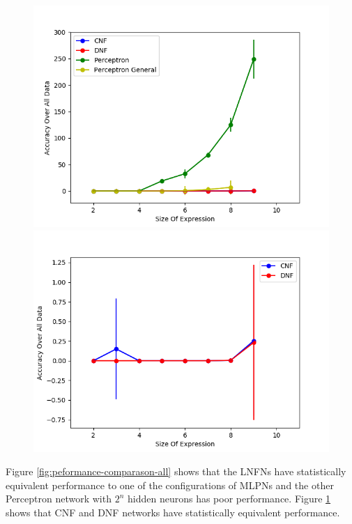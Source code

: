 \begin{figure}[H]
  \centering
  \begin{minipage}[b]{0.45\textwidth}
    \includegraphics[width=\textwidth]{All-Peformance-Comparason.png}
    \caption{}
    \label{fig:peformance-comparason-all}
  \end{minipage}
  \begin{minipage}[b]{0.45\textwidth}
    \includegraphics[width=\textwidth]{CNFvsDNF.png}
    \caption{}
    \label{fig:peformance-comparason-cnfdnf}
  \end{minipage}
  \hfill
\end{figure}

Figure \ref{fig:peformance-comparason-all} shows that the LNFNs have statistically equivalent performance to one of the configurations of MLPNs and the other Perceptron network with $2^n$ hidden neurons has poor performance. Figure \ref{fig:peformance-comparason-cnfdnf} shows that CNF and DNF networks have statistically equivalent performance. 

